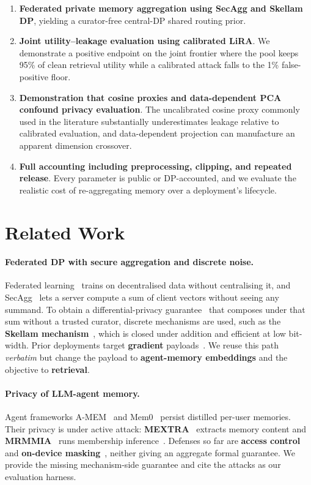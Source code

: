 \documentclass[conference]{IEEEtran}
\theoremstyle{remark}
\begin{document}
\begin{enumerate}
  \item \textbf{Federated private memory aggregation using SecAgg and Skellam DP}, yielding a curator-free central-DP shared routing prior.
  \item \textbf{Joint utility--leakage evaluation using calibrated LiRA}. We demonstrate a positive endpoint on the joint frontier where the pool keeps 95\% of clean retrieval utility while a calibrated attack falls to the 1\% false-positive floor.
  \item \textbf{Demonstration that cosine proxies and data-dependent PCA confound privacy evaluation}. The uncalibrated cosine proxy commonly used in the literature substantially underestimates leakage relative to calibrated evaluation, and data-dependent projection can manufacture an apparent dimension crossover.
  \item \textbf{Full accounting including preprocessing, clipping, and repeated release}. Every parameter is public or DP-accounted, and we evaluate the realistic cost of re-aggregating memory over a deployment's lifecycle.
\end{enumerate}

\section{Related Work}\label{sec:related}

\paragraph{Federated DP with secure aggregation and discrete noise.} Federated learning~\cite{mcmahan2017fedavg} trains on decentralised data without centralising it, and SecAgg~\cite{bonawitz2017secagg} lets a server compute a sum of client vectors without seeing any summand. To obtain a differential-privacy guarantee~\cite{dwork2014foundations} that composes under that sum without a trusted curator, discrete mechanisms are used, such as the \textbf{Skellam mechanism}~\cite{agarwal2021skellam}, which is closed under addition and efficient at low bit-width. Prior deployments target \textbf{gradient} payloads~\cite{kairouz2021ddgauss,abadi2016dpsgd}. We reuse this path \emph{verbatim} but change the payload to \textbf{agent-memory embeddings} and the objective to \textbf{retrieval}.

\paragraph{Privacy of LLM-agent memory.} Agent frameworks A-MEM~\cite{xu2024amem} and Mem0~\cite{chhikara2024mem0} persist distilled per-user memories. Their privacy is under active attack: \textbf{MEXTRA}~\cite{wang2025mextra} extracts memory content and \textbf{MRMMIA}~\cite{chen2026mrmmia} runs membership inference~\cite{shokri2017mia}. Defenses so far are \textbf{access control}~\cite{rezazadeh2025collabmem} and \textbf{on-device masking}~\cite{chen2026memprivacy}, neither giving an aggregate formal guarantee. We provide the missing mechanism-side guarantee and cite the attacks as our evaluation harness.
\end{document}
